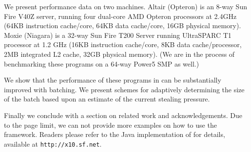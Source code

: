 We present performance data on two machines. Altair (Opteron) is an
8-way Sun Fire V40Z server, running four dual-core AMD Opteron
processors at 2.4GHz (64KB instruction cache/core, 64KB data
cache/core, 16GB physical memory). Moxie (Niagara) is a 32-way Sun
Fire T200 Server running UltraSPARC T1 processor at 1.2 GHz (16KB
instruction cache/core, 8KB data cache/processor, 2MB integrated L2
cache, 32GB physical memory). (We are in the process of benchmarking
these programs on a 64-way Power5 SMP as well.)


We show that the performance of these programs in \XWS{} can be
substantially improved with batching. We present schemes for
adaptively determining the size of the batch based upon an estimate of
the current stealing pressure.

Finally we conclude with a section on related work and acknowledgements. Due to the page limit, we can not provide more examples on how to use the \XWS{} framework. Readers please refer to the Java implementation of \XWS{} for details, available at {\tt http://x10.sf.net}.  